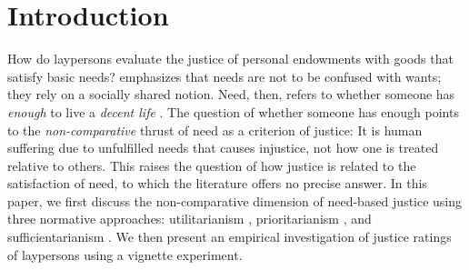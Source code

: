 \documentclass[12pt]{scrartcl}
\begin{document}
\renewcommand{\thefootnote}{\arabic{footnote}}\setcounter{footnote}{0}
\newpage


\section{Introduction}\label{sec:introduction}
How do laypersons evaluate the justice of personal endowments with goods that satisfy basic needs?
\cite{miller_principles_1999} emphasizes that needs are not to be confused with wants; they rely on a socially shared notion.
Need, then, refers to whether someone has \textit{enough} \citep{frankfurt_inequality_2015} to live a \textit{decent life} \citep{miller_principles_1999}.
The question of whether someone has enough points to the \textit{non-comparative} \citep{feinberg_noncomparative_1974} thrust of need as a criterion of justice: It is human suffering due to unfulfilled needs that causes injustice, not how one is treated relative to others.
This raises the question of how justice is related to the satisfaction of need, to which the literature offers no precise answer.
In this paper, we first discuss the non-comparative dimension of need-based justice using three normative approaches: utilitarianism \citep[e.\,g.,][]{bentham_introduction_2009,mill_utilitarianism_1998}, prioritarianism \citep[e.\,g.,][]{parfit_equality_1997}, and sufficientarianism \citep[e.\,g.,][]{frankfurt_equality_1987,crisp_egalitarianism_2003,schramme_is_2006}.
We then present an empirical investigation of justice ratings of laypersons using a vignette experiment.
\end{document}
